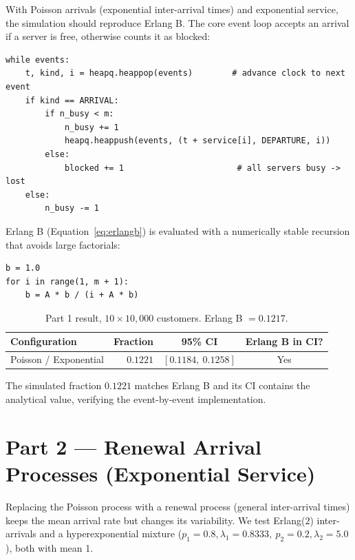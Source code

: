 With Poisson arrivals (exponential inter-arrival times) and
exponential service, the simulation should reproduce Erlang B. The core event
loop accepts an arrival if a server is free, otherwise counts it as blocked:
\begin{verbatim}
while events:
    t, kind, i = heapq.heappop(events)        # advance clock to next event
    if kind == ARRIVAL:
        if n_busy < m:
            n_busy += 1
            heapq.heappush(events, (t + service[i], DEPARTURE, i))
        else:
            blocked += 1                       # all servers busy -> lost
    else:
        n_busy -= 1
\end{verbatim}
Erlang B (Equation~\ref{eq:erlangb}) is evaluated with a numerically stable
recursion that avoids large factorials:
\begin{verbatim}
b = 1.0
for i in range(1, m + 1):
    b = A * b / (i + A * b)
\end{verbatim}

\begin{table}[h]
    \centering
    \caption{Part 1 result, $10 \times 10{,}000$ customers. Erlang B $= 0.1217$.}
    \label{tab:part1}
    \renewcommand{\arraystretch}{1.1}
    \begin{tabular}{lrcc}
        \toprule
        Configuration & Fraction & 95\% CI & Erlang B in CI? \\
        \midrule
        Poisson / Exponential & $0.1221$ & $[0.1184,\ 0.1258]$ & Yes \\
        \bottomrule
    \end{tabular}
\end{table}

The simulated fraction $0.1221$ matches Erlang B and its CI contains the
analytical value, verifying the event-by-event implementation.

\section*{Part 2 --- Renewal Arrival Processes (Exponential Service)}

Replacing the Poisson process with a renewal process (general inter-arrival
times) keeps the mean arrival rate but changes its variability.
We test Erlang($2$) inter-arrivals and a hyperexponential mixture
($p_1 = 0.8, \lambda_1 = 0.8333,\ p_2 = 0.2, \lambda_2 = 5.0$), both with mean 1.

